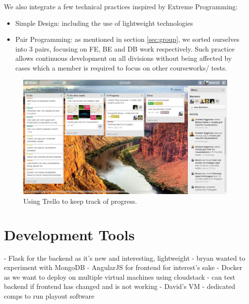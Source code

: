 \documentclass[a4paper]{article}
\begin{document}
We also integrate a few technical practices inspired by Extreme Programming:
\begin{itemize}
  \item Simple Design: including the use of lightweight technologies
  \item Pair Programming: as mentioned in section \ref{sec:group}, we sorted
        ourselves into 3 pairs, focusing on FE, BE and DB work respectively.
        Such practice allows continuous development on all divisions without
        being affected by cases which a member is required to focus on
        other courseworks/ tests.


\end{itemize} 

\begin{figure}
  \centering
    \includegraphics[width = 0.99\textwidth]{./planning/trello.jpg}
   
  \caption{Using Trello to keep track of progress.}
  \label{fig:trello}
\end{figure}

\section{Development Tools}
 	- Flask for the backend as it's new and interesting, lightweight
	- bryan wanted to experiment with MongoDB
	- AngularJS for frontend for interest's sake
	- Docker as we want to deploy on multiple virtual machines using cloudstack
	- can test backend if frontend has changed and is not working
  - David's VM
	- dedicated comps to run playout software
\end{document}
